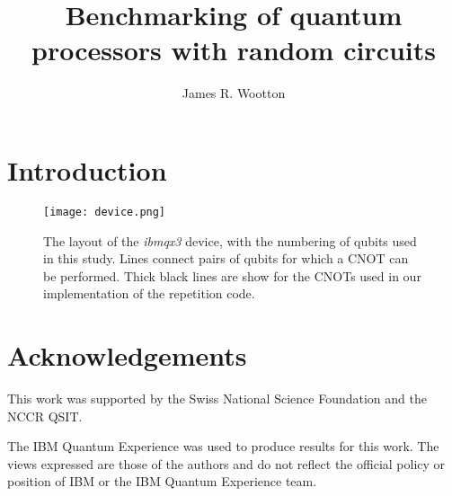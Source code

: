\documentclass[aps,prl,twocolumn,showpacs,preprintnumbers]{revtex4-1}
\begin{document}
\title{Benchmarking of quantum processors with random circuits}
\author{James R. Wootton}


\begin{abstract}








\end{abstract}


\pacs{}

\maketitle


\section{Introduction}





\begin{figure}[t]
\begin{center}
{\texttt{[image: device.png]}}
\caption{\label{device} The layout of the \emph{ibmqx3} device, with the numbering of qubits used in this study. Lines connect pairs of qubits for which a CNOT can be performed. Thick black lines are show for the CNOTs used in our implementation of the repetition code.
}
\end{center}
\end{figure}




\section{Acknowledgements}

This work was supported by the Swiss National Science Foundation and the NCCR QSIT.

The IBM Quantum Experience was used to produce results for this work. The views expressed are those of the authors and do not reflect the official policy or position of IBM or the IBM Quantum Experience team.



\end{document}
